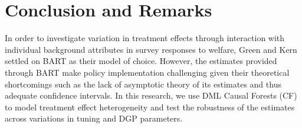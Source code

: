 \documentclass[12pt]{article}
\begin{document}
\begin{table}
\begin{subtable}{\textwidth}
\vspace{0.5cm}
\caption{\label{table:twof}Number of Estimators} 
\end{subtable}
\end{table}



\clearpage
\section{Conclusion and Remarks}
In order to investigate variation in treatment effects through interaction with individual background attributes in survey responses to welfare, Green and Kern settled on BART as their model of choice. However, the estimates provided through BART make policy implementation challenging given their theoretical shortcomings such as the lack of asymptotic theory of its estimates and thus adequate confidence intervals. In this research, we use DML Causal Forests (CF) to model treatment effect heterogeneity and test the robustness of the estimates across variations in tuning and DGP parameters. \\
\end{document}
